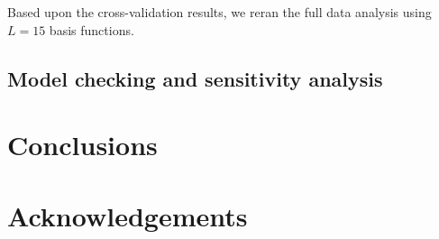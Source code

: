\documentclass[11pt]{article}
\begin{document}
Based upon the cross-validation results, we reran the full data analysis using $L = 15$ basis functions.



\subsection{Model checking and sensitivity analysis}


\section{Conclusions}\label{s:con}

\section*{Acknowledgements}


\begin{singlespace}


\end{singlespace}
\end{document}
